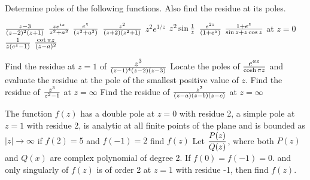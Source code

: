 	\begin{problems}		

		
     	\prob  Determine poles of the following functions. Also find the residue at its poles.
           	
           	\subprob  $z-3 \over (z-2)^2 (z+1)$
           	\subprob  $ze^{iz} \over z^2 + a^2$
             	\subprob  $e^z \over (z^2 + a^2)$
           	\subprob  $z^2 \over (z+2)(z^2+1)$
           		\subprob  $z^2 e^{1/z}$
           	\subprob  $z^2 \sin {1 \over z}$
           	\subprob  $e^{2z} \over (1+e^z)$
           	\subprob  $1+e^z \over \sin z + z \cos z$ at $z=0$
           	\subprob  $1 \over z(e^z-1)$
           		\subprob  $\cot \pi z \over (z-a)^2$
          
		\prob  Find the residue at $z=1$ of $\displaystyle z^3 \over (z-1)^4(z-2)(z-3)$
		\prob  Locate the poles of $\displaystyle e^{az} \over \cosh \pi z $ and evaluate the residue at the pole of the smallest positive value of $z$.
		\prob  Find the residue of $z^3 \over z^2-1$ at $z=\infty$
		\prob  Find the residue of $z^2 \over (z-a)(z-b)(z-c)$ at ${z=\infty}$
	
	\prob  The function $f(z)$ has a double pole at $z=0$ with residue 2, a simple pole at $z=1$ with residue 2, is analytic at all finite points of the plane and is bounded as $|z|\rightarrow \infty$ if $f(2)=5$ and $f(-1)=2$ find $f(z)$						
\prob Let $\displaystyle \frac{P(z)}{Q(z)}$, where both $P(z)$ and $Q(x)$ are complex polynomial
of degree 2. If $f(0) = f(-1) = 0$. and only singularly of $f(z)$ is of order 2 at $z =1$ with residue -1, then find $f(z)$.		
\end{problems}


